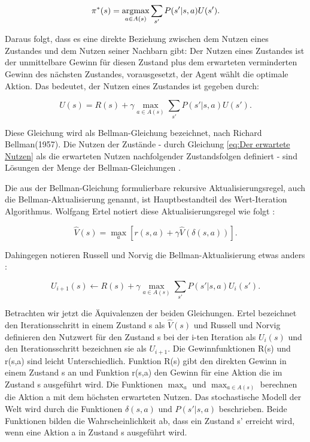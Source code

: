 \begin{equation}
\pi^*(s) = \operatorname*{arg\!\max}_{a \in A(s)} \sum_{s'} P(s'|s, a) U(s').
\end{equation}

Daraus folgt, dass es eine direkte Beziehung zwischen dem Nutzen eines Zustandes und dem Nutzen seiner Nachbarn gibt: Der Nutzen eines Zustandes ist der unmittelbare Gewinn für diesen Zustand plus dem erwarteten verminderten Gewinn des nächsten Zustandes, vorausgesetzt, der Agent wählt die optimale Aktion. Das bedeutet, der Nutzen eines Zustandes ist gegeben durch:

\begin{equation}
U(s) = R(s) + \gamma \max_{a \in A(s)} \sum_{s'} P(s'|s, a) U(s').
\end{equation}

Diese Gleichung wird als Bellman-Gleichung bezeichnet, nach Richard Bellman(1957). Die Nutzen der Zustände - durch Gleichung \ref{eq:Der erwartete Nutzen} als die erwarteten Nutzen nachfolgender Zustandsfolgen definiert - sind Lösungen der Menge der Bellman-Gleichungen \cite[759]{Russell}.

Die aus der Bellman-Gleichung formulierbare rekursive Aktualisierungsregel, auch die Bellman-Aktualisierung genannt, ist Hauptbestandteil des Wert-Iteration Algorithmus. Wolfgang Ertel notiert diese Aktualisierungsregel wie folgt \cite[294]{Ertel}:

\begin{equation}
\hat{V}(s) = \max_a [r(s,a) + \gamma \hat{V}(\delta(s,a))].
\end{equation}

Dahingegen notieren Russell und Norvig die Bellman-Aktualisierung etwas anders \cite[760]{Russell}:

\begin{equation}
U_{i+1}(s) \leftarrow R(s) + \gamma \max_{a \in A(s)} \sum_{s'} P(s'|s,a)U_i(s').
\end{equation} 

Betrachten wir jetzt die Äquivalenzen der beiden Gleichungen. Ertel bezeichnet den Iterationsschritt in einem Zustand s als $\hat{V}(s)$ und Russell und Norvig definieren den Nutzwert für den Zustand s bei der i-ten Iteration als $U_{i}(s)$ und den Iterationsschritt bezeichnen sie als $U_{i+1}$. Die Gewinnfunktionen R(s) und r(s,a) sind leicht Unterschiedlich. Funktion R(s) gibt den direkten Gewinn in einem Zustand s an und Funktion r(s,a) den Gewinn für eine Aktion die im Zustand s ausgeführt wird. Die Funktionen $\max_a$ und $\max_{a \in A(s)}$ berechnen die Aktion a mit dem höchsten erwarteten Nutzen. Das stochastische Modell der Welt wird durch die Funktionen $\delta(s,a)$ und $P(s'|s,a)$ beschrieben. Beide Funktionen bilden die Wahrscheinlichkeit ab, dass ein Zustand s' erreicht wird, wenn eine Aktion a in Zustand s ausgeführt wird. \\


